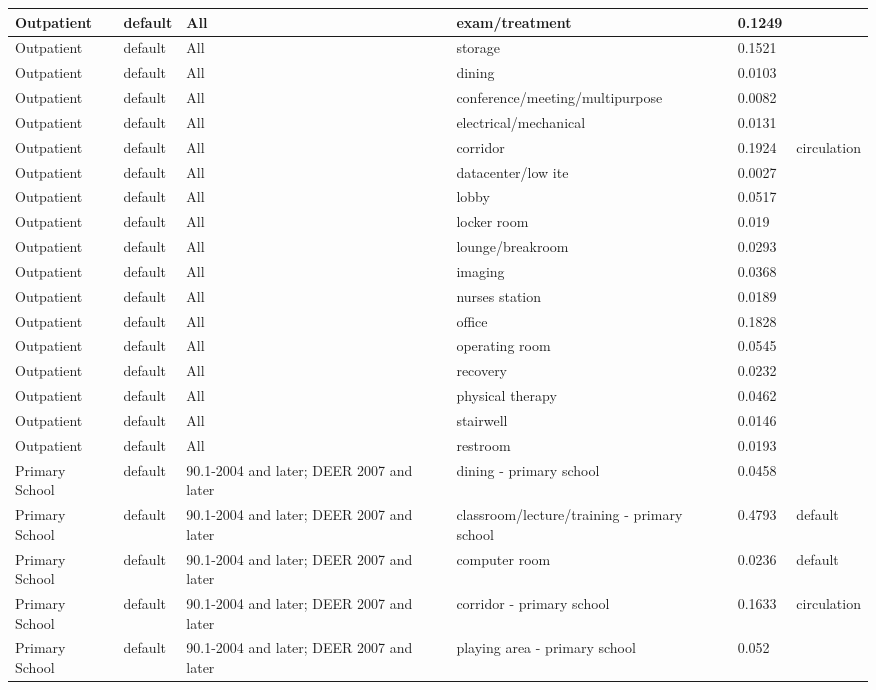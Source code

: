 \begin{center}
\begin{longtable}{|p{1.0in}|p{1.05in}|p{1.1in}|p{1.9in}|p{0.55in}|p{0.95in}|}
Outpatient & default & All & exam/treatment & 0.1249 &  \\ \hline
Outpatient & default & All & storage & 0.1521 &  \\ \hline
Outpatient & default & All & dining & 0.0103 &  \\ \hline
Outpatient & default & All & conference/meeting/multipurpose & 0.0082 &  \\ \hline
Outpatient & default & All & electrical/mechanical & 0.0131 &  \\ \hline
Outpatient & default & All & corridor & 0.1924 & circulation \\ \hline
Outpatient & default & All & datacenter/low ite & 0.0027 &  \\ \hline
Outpatient & default & All & lobby & 0.0517 &  \\ \hline
Outpatient & default & All & locker room & 0.019 &  \\ \hline
Outpatient & default & All & lounge/breakroom & 0.0293 &  \\ \hline
Outpatient & default & All & imaging & 0.0368 &  \\ \hline
Outpatient & default & All & nurses station & 0.0189 &  \\ \hline
Outpatient & default & All & office & 0.1828 &  \\ \hline
Outpatient & default & All & operating room & 0.0545 &  \\ \hline
Outpatient & default & All & recovery & 0.0232 &  \\ \hline
Outpatient & default & All & physical therapy & 0.0462 &  \\ \hline
Outpatient & default & All & stairwell & 0.0146 &  \\ \hline
Outpatient & default & All & restroom & 0.0193 &  \\ \hline
Primary School & default & 90.1-2004 and later; DEER 2007 and later & dining - primary school & 0.0458 &  \\ \hline
Primary School & default & 90.1-2004 and later; DEER 2007 and later & classroom/lecture/training - primary school & 0.4793 & default \\ \hline
Primary School & default & 90.1-2004 and later; DEER 2007 and later & computer room & 0.0236 & default \\ \hline
Primary School & default & 90.1-2004 and later; DEER 2007 and later & corridor - primary school & 0.1633 & circulation \\ \hline
Primary School & default & 90.1-2004 and later; DEER 2007 and later & playing area - primary school & 0.052 &  \\ \hline

\end{longtable}
\end{center}
